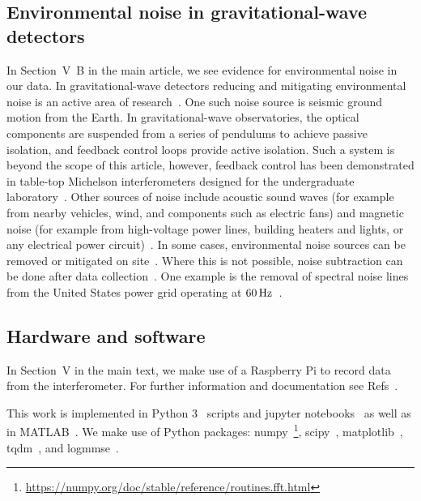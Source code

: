 \documentclass[aps,pra,superscriptaddress,reprint]{revtex4-2}
\begin{document}
\subsection{Environmental noise in gravitational-wave detectors}
In Section~V~B in the main article, we see evidence for environmental noise in our data. 
In gravitational-wave detectors reducing and mitigating environmental noise is an active area of research~\cite{EfflerEtAl:2015}. 
One such noise source is seismic ground motion from the Earth. 
In gravitational-wave observatories, the optical components are suspended from a series of pendulums to achieve passive isolation, and feedback control loops provide active isolation\cite{MatichardEtAl:2015, AdvancedVirgo:2015}. 
Such a system is beyond the scope of this article, however, feedback control has been demonstrated in table-top Michelson interferometers designed for the undergraduate laboratory~\cite{LibbrechtBlack:2015}.
Other sources of noise include acoustic sound waves (for example from nearby vehicles, wind, and components such as electric fans) and magnetic noise (for example from high-voltage power lines, building heaters and lights, or any electrical power circuit)~\cite{EfflerEtAl:2015,CironeEtAl:2019}.
In some cases, environmental noise sources can be removed or mitigated on site~\cite{CovasEtAl:2018}. 
Where this is not possible, noise subtraction can be done after data collection~\cite{DriggersEtAl:2019, DavisEtAl:2019}. 
One example is the removal of spectral noise lines from the United States power grid operating at $60\,{\rm Hz}$~\cite{VajenteEtAl:2020}. %
 

\subsection{Hardware and software}
In Section~V in the main text, we make use of a Raspberry Pi to record data from the interferometer. 
For further information and documentation see Refs~\cite{RaspberryPi:online,pidocumentation:online}.

This work is implemented in Python 3~\cite{python} scripts and jupyter notebooks~\cite{jupyter,ipython} as well as in MATLAB~\cite{MATLAB}. 
We make use of Python packages: numpy~\cite{numpy}\footnote{\url{https://numpy.org/doc/stable/reference/routines.fft.html}}, scipy~\cite{scipy}, matplotlib~\cite{matplotlib}, tqdm~\cite{tqdm}, and logmmse~\cite{logmmse}.
\end{document}
